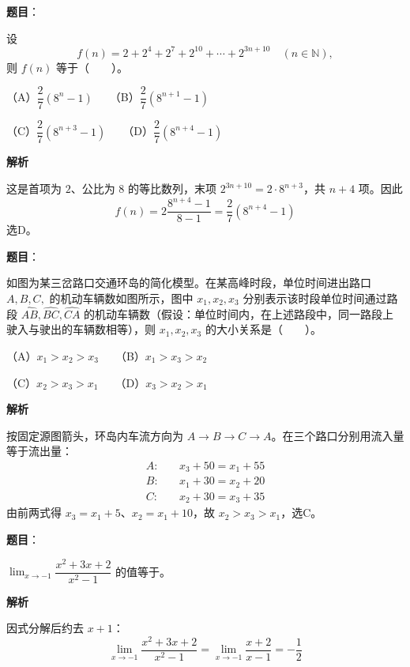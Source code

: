 \begin{answer}

\textbf{题目}：

设
\nopagebreak[4]
\[
f(n)=2+2^4+2^7+2^{10}+\cdots+2^{3n+10}\quad(n\in\mathbb N),
\]
则 $f(n)$ 等于\mbox{（　　）}。

（A）$\dfrac27(8^n-1)$　　（B）$\dfrac27(8^{n+1}-1)$

（C）$\dfrac27(8^{n+3}-1)$　　（D）$\dfrac27(8^{n+4}-1)$

\textbf{解析}

这是首项为 $2$、公比为 $8$ 的等比数列，末项 $2^{3n+10}=2\cdot8^{n+3}$，共 $n+4$ 项。因此
\nopagebreak[4]
\[
f(n)=2\frac{8^{n+4}-1}{8-1}=\frac27(8^{n+4}-1)
\]
选D。


\end{answer}
\begin{answer}

\textbf{题目}：

如图为某三岔路口交通环岛的简化模型。在某高峰时段，单位时间进出路口 $A,B,C,$ 的机动车辆数如图所示，图中 $x_1,x_2,x_3$ 分别表示该时段单位时间通过路段 $\widehat{AB},\widehat{BC},\widehat{CA}$ 的机动车辆数（假设：单位时间内，在上述路段中，同一路段上驶入与驶出的车辆数相等），则 $x_1,x_2,x_3$ 的大小关系是\mbox{（　　）}。
\nopagebreak[4]
\begin{center}\end{center}
\nopagebreak[4]
（A）$x_1>x_2>x_3$　　（B）$x_1>x_3>x_2$

（C）$x_2>x_3>x_1$　　（D）$x_3>x_2>x_1$

\textbf{解析}

按固定源图箭头，环岛内车流方向为 $A\to B\to C\to A$。在三个路口分别用流入量等于流出量：
\nopagebreak[4]
\[
\begin{aligned}
A:&\quad x_3+50=x_1+55\\
B:&\quad x_1+30=x_2+20\\
C:&\quad x_2+30=x_3+35
\end{aligned}
\]
由前两式得 $x_3=x_1+5$、$x_2=x_1+10$，故 $x_2>x_3>x_1$，选C。


\end{answer}
\begin{answer}

\textbf{题目}：

$\displaystyle\lim_{x\to-1}\dfrac{x^2+3x+2}{x^2-1}$ 的值等于\gkblank{}。

\textbf{解析}

因式分解后约去 $x+1$：
\nopagebreak[4]
\[
\lim_{x\to-1}\frac{x^2+3x+2}{x^2-1}
=\lim_{x\to-1}\frac{x+2}{x-1}=-\frac12
\]


\end{answer}
